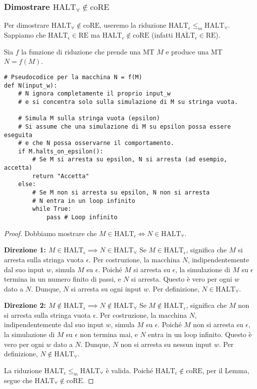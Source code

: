 \documentclass[a4paper]{article}
\begin{document}
\subsubsection{Dimostrare $\text{HALT}_\forall \notin \text{coRE}$}
Per dimostrare $\text{HALT}_\forall \notin \text{coRE}$, useremo la riduzione $\text{HALT}_\epsilon \le_m \text{HALT}_\forall$.
Sappiamo che $\text{HALT}_\epsilon \in \text{RE}$ ma $\text{HALT}_\epsilon \notin \text{coRE}$ (infatti $\overline{\text{HALT}_\epsilon} \in \text{RE}$).

Sia $f$ la funzione di riduzione che prende una MT $M$ e produce una MT $N = f(M)$.
\begin{verbatim}
# Pseudocodice per la macchina N = f(M)
def N(input_w):
    # N ignora completamente il proprio input_w
    # e si concentra solo sulla simulazione di M su stringa vuota.
    
    # Simula M sulla stringa vuota (epsilon)
    # Si assume che una simulazione di M su epsilon possa essere eseguita
    # e che N possa osservarne il comportamento.
    if M.halts_on_epsilon():
        # Se M si arresta su epsilon, N si arresta (ad esempio, accetta)
        return "Accetta"
    else:
        # Se M non si arresta su epsilon, N non si arresta
        # N entra in un loop infinito
        while True:
            pass # Loop infinito
\end{verbatim}

\begin{proof}
Dobbiamo mostrare che $M \in \text{HALT}_\epsilon \iff N \in \text{HALT}_\forall$.

\textbf{Direzione 1: $M \in \text{HALT}_\epsilon \implies N \in \text{HALT}_\forall$}
Se $M \in \text{HALT}_\epsilon$, significa che $M$ si arresta sulla stringa vuota $\epsilon$.
Per costruzione, la macchina $N$, indipendentemente dal suo input $w$, simula $M$ su $\epsilon$. Poiché $M$ si arresta su $\epsilon$, la simulazione di $M$ su $\epsilon$ termina in un numero finito di passi, e $N$ si arresta.
Questo è vero per ogni $w$ dato a $N$. Dunque, $N$ si arresta su ogni input $w$. Per definizione, $N \in \text{HALT}_\forall$.

\textbf{Direzione 2: $M \notin \text{HALT}_\epsilon \implies N \notin \text{HALT}_\forall$}
Se $M \notin \text{HALT}_\epsilon$, significa che $M$ non si arresta sulla stringa vuota $\epsilon$.
Per costruzione, la macchina $N$, indipendentemente dal suo input $w$, simula $M$ su $\epsilon$. Poiché $M$ non si arresta su $\epsilon$, la simulazione di $M$ su $\epsilon$ non termina mai, e $N$ entra in un loop infinito.
Questo è vero per ogni $w$ dato a $N$. Dunque, $N$ non si arresta su nessun input $w$. Per definizione, $N \notin \text{HALT}_\forall$.

La riduzione $\text{HALT}_\epsilon \le_m \text{HALT}_\forall$ è valida.
Poiché $\text{HALT}_\epsilon \notin \text{coRE}$, per il Lemma, segue che $\text{HALT}_\forall \notin \text{coRE}$.
\end{proof}
\end{document}
